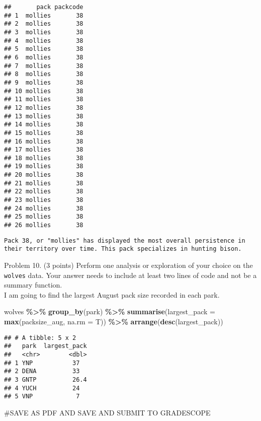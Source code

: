 \documentclass[
]{article}
\newenvironment{Shaded}{\begin{snugshade}}{\end{snugshade}}
\newcommand{\AttributeTok}[1]{\textcolor[rgb]{0.13,0.29,0.53}{#1}}
\newcommand{\FunctionTok}[1]{\textcolor[rgb]{0.13,0.29,0.53}{\textbf{#1}}}
\newcommand{\NormalTok}[1]{#1}
\newcommand{\SpecialCharTok}[1]{\textcolor[rgb]{0.81,0.36,0.00}{\textbf{#1}}}
\begin{document}
\begin{verbatim}
##       pack packcode
## 1  mollies       38
## 2  mollies       38
## 3  mollies       38
## 4  mollies       38
## 5  mollies       38
## 6  mollies       38
## 7  mollies       38
## 8  mollies       38
## 9  mollies       38
## 10 mollies       38
## 11 mollies       38
## 12 mollies       38
## 13 mollies       38
## 14 mollies       38
## 15 mollies       38
## 16 mollies       38
## 17 mollies       38
## 18 mollies       38
## 19 mollies       38
## 20 mollies       38
## 21 mollies       38
## 22 mollies       38
## 23 mollies       38
## 24 mollies       38
## 25 mollies       38
## 26 mollies       38
\end{verbatim}

\begin{verbatim}
Pack 38, or "mollies" has displayed the most overall persistence in their territory over time. This pack specializes in hunting bison.
\end{verbatim}

Problem 10. (3 points) Perform one analysis or exploration of your
choice on the \texttt{wolves} data. Your answer needs to include at
least two lines of code and not be a summary function.\\
I am going to find the largest August pack size recorded in each park.

\begin{Shaded}
\begin{Highlighting}[]
\NormalTok{wolves }\SpecialCharTok{\%\textgreater{}\%}
  \FunctionTok{group\_by}\NormalTok{(park) }\SpecialCharTok{\%\textgreater{}\%}
  \FunctionTok{summarise}\NormalTok{(}\AttributeTok{largest\_pack =} \FunctionTok{max}\NormalTok{(packsize\_aug, }\AttributeTok{na.rm =}\NormalTok{ T)) }\SpecialCharTok{\%\textgreater{}\%}
  \FunctionTok{arrange}\NormalTok{(}\FunctionTok{desc}\NormalTok{(largest\_pack))}
\end{Highlighting}
\end{Shaded}

\begin{verbatim}
## # A tibble: 5 x 2
##   park  largest_pack
##   <chr>        <dbl>
## 1 YNP           37  
## 2 DENA          33  
## 3 GNTP          26.4
## 4 YUCH          24  
## 5 VNP            7
\end{verbatim}

\#SAVE AS PDF AND SAVE AND SUBMIT TO GRADESCOPE
\end{document}
